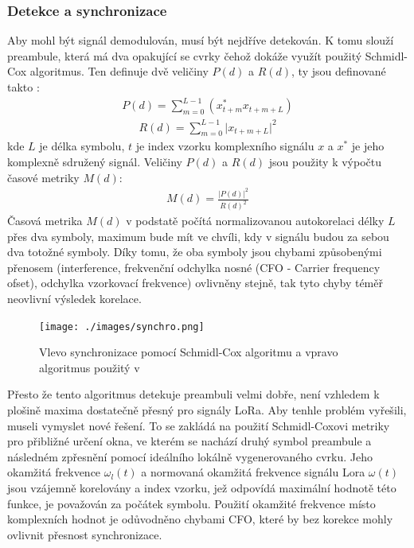\documentclass{ctuthesis}
\begin{document}
\subsubsection{Detekce a synchronizace}
\label{subsec:detection}
Aby mohl být signál demodulován, musí být nejdříve detekován. K tomu slouží preambule, která má dva opakující se cvrky čehož dokáže využít použitý Schmidl-Cox algoritmus. Ten definuje dvě veličiny $P(d)$ a $R(d)$, ty jsou definované takto \cite{schmidlcox1997}:
\begin{align}P(d) = \sum_{m=0}^{L-1} (x_{t+m}^{\ast}x_{t+m+L})
\label{eq:lora3}
\end{align}
\begin{align}
R(d) = \sum_{m=0}^{L-1} \lvert{x_{t+m+L}}\rvert^{2}
\label{eq:lora4}
\end{align}
kde $L$ je délka symbolu, $t$ je index vzorku komplexního signálu $x$ a $x^{\ast}$ je jeho komplexně sdružený signál. Veličiny $P(d)$ a $R(d)$ jsou použity k výpočtu časové metriky $M(d)$:
\begin{align}
M(d) = \frac{\vert P(d) \rvert ^{2}}{R(d)^{2}}
\label{eq:lora5}
\end{align}
Časová metrika $M(d)$ v podstatě počítá normalizovanou autokorelaci délky $L$ přes dva symboly, maximum bude mít ve chvíli, kdy v signálu budou za sebou dva totožné symboly. Díky tomu, že oba symboly jsou chybami způsobenými přenosem (interference, frekvenční odchylka nosné (CFO - Carrier frequency ofset), odchylka vzorkovací frekvence) ovlivněny stejně, tak tyto chyby téměř neovlivní výsledek korelace. \\
\begin{figure}
\caption{Vlevo synchronizace pomocí Schmidl-Cox algoritmu a vpravo algoritmus použitý v \cite{gr-lora2018}}
\texttt{[image: ./images/synchro.png]}
\label{fig:loraSyn}
\end{figure}
Přesto že tento algoritmus detekuje preambuli velmi dobře, není vzhledem k plošině maxima dostatečně přesný pro signály LoRa. Aby \cite{gr-lora2018} tenhle problém vyřešili, museli vymyslet nové řešení. To se zakládá na použití Schmidl-Coxovi metriky pro přibližné určení okna, ve kterém se nachází druhý symbol preambule a následném zpřesnění pomocí ideálního lokálně vygenerovaného cvrku. Jeho okamžitá frekvence $\omega_{l}(t)$ a normovaná okamžitá frekvence signálu Lora  $\omega(t)$ jsou vzájemně korelovány a index vzorku, jež odpovídá maximální hodnotě této funkce, je považován za počátek symbolu. Použití okamžité frekvence místo komplexních hodnot je odůvodněno chybami CFO, které by bez korekce mohly ovlivnit přesnost synchronizace.
\end{document}
